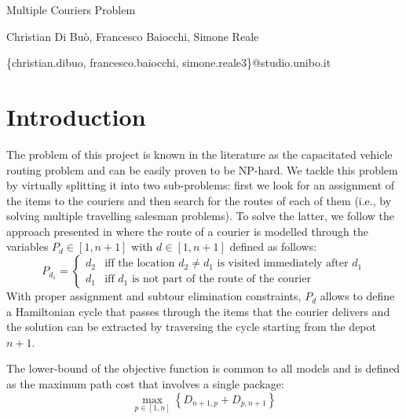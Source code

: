 \documentclass{article}
\begin{document}
    \begin{titlepage}
        \begin{center}
            {\LARGE Multiple Couriers Problem}
            \vspace*{1em}
            
            Christian Di Buò, Francesco Baiocchi, Simone Reale

            \centerline{\{christian.dibuo, francesco.baiocchi, simone.reale3\}@studio.unibo.it}
        \end{center}
    \end{titlepage}

    \thispagestyle{plain}

    \section{Introduction} \label{sec:intro}
    The problem of this project is known in the literature as the capacitated vehicle routing problem and can be easily proven to be NP-hard. We tackle this problem by virtually splitting it into two sub-problems: first we look for an assignment of the items to the couriers and then search for the routes of each of them (i.e., by solving multiple travelling salesman problems). To solve the latter, we follow the approach presented in \cite{vrp} where the route of a courier is modelled through the variables $P_d \in [1, n+1]$ with $d \in [1, n+1]$ defined as follows:
    \begin{equation}
        \label{eq:path_def}
        P_{d_1} = \begin{cases}
            d_2 & \text{iff the location $d_2 \neq d_1$ is visited immediately after $d_1$}\\
            d_1 & \text{iff $d_1$ is not part of the route of the courier}
        \end{cases}
    \end{equation} 
    With proper assignment and subtour elimination constraints, $P_d$ allows to define a Hamiltonian cycle that passes through the items that the courier delivers and the solution can be extracted by traversing the cycle starting from the depot $n+1$.

    The lower-bound of the objective function is common to all models and is defined as the maximum path cost that involves a single package:
    \begin{equation}
        \max_{p \in [1, n]} \left\{ D_{n+1, p} + D_{p, n+1} \right\}
    \end{equation}
\end{document}
